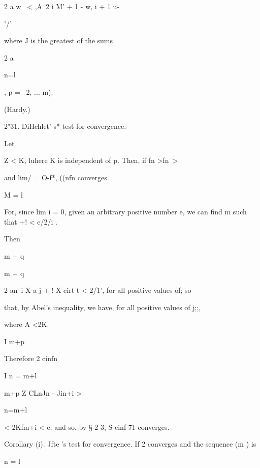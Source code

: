 2 a w \ < ,A\ 2 i M' + 1 - w, i + 1 u-



'/'



where J is the greatest of the sums



2 a

n=l



, p = \, 2, ... m).



(Hardy.)



2"31. DiHchlet' s* test for convergence.



Let



Z < K, luhere K is independent of p. Then, if fn >fn\-\ >



and lim/ = O-f*, ((nfn converges.

M = l

For, since lim i = 0, given an arbitrary positive number e, we can
find m such that +! < e/2/i .



Then



m + q



m + q



2 an\ i X a j + ! X cirt t < 2/1', for all positive values of; so



that, by Abel's inequality, we have, for all positive values of j;;,



where A <2K.

I m+p

Therefore 2 cinfn

I n = m+l



m+p Z CLnJn - Jin+i >



n=m+l



< 2Kfm+i < e; and so, by § 2-3, S cinf 71 converges.



Corollary (i). Jfte 's test for convergence. If 2 converges and the
sequence (m ) is

n = l

